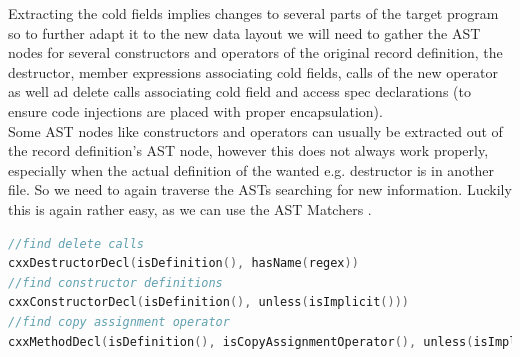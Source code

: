 Extracting the cold fields implies changes to several parts of the target program so to further adapt it to the new data layout we will need to gather the AST nodes for several constructors and operators of the original record definition, the destructor, member expressions associating cold fields, calls of the new operator as well ad delete calls associating cold field and access spec declarations (to ensure code injections are placed with proper encapsulation).\\
Some AST nodes like constructors and operators can usually be extracted out of the record definition's AST node, however this does not always work properly, especially when the actual definition of the wanted e.g. destructor is in another file. So we need to again traverse the ASTs searching for new information. Luckily this is again rather easy, as we can use the AST Matchers .
\begin{lstlisting}[language=C++, name={Shortened excerpts for some AST Matchers to retrieve some of the information we need to implement changes - second data aggregation.}, label={second_data_aggregation}]
//find delete calls
cxxDestructorDecl(isDefinition(), hasName(regex))
//find constructor definitions
cxxConstructorDecl(isDefinition(), unless(isImplicit()))
//find copy assignment operator
cxxMethodDecl(isDefinition(), isCopyAssignmentOperator(), unless(isImplicit()))
\end{lstlisting}
